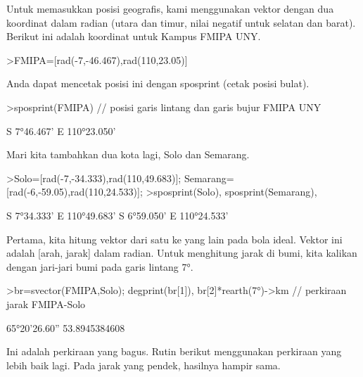\documentclass[a4paper,10pt]{article}
\begin{document}
\begin{eulernotebook}
\begin{eulercomment}
\begin{eulercomment}
\begin{eulercomment}
\begin{eulercomment}
\begin{eulercomment}
\begin{eulercomment}
\begin{eulercomment}
\begin{eulercomment}
\begin{eulercomment}
\begin{eulercomment}
\begin{eulercomment}
\begin{eulercomment}
\begin{eulercomment}
\begin{eulercomment}
\begin{eulercomment}
\begin{eulercomment}
\begin{eulercomment}
\begin{eulercomment}
\begin{eulercomment}
Untuk memasukkan posisi geografis, kami menggunakan vektor dengan dua
koordinat dalam radian (utara dan timur, nilai negatif untuk selatan
dan barat). Berikut ini adalah koordinat untuk Kampus FMIPA UNY.
\end{eulercomment}
\begin{eulerprompt}
>FMIPA=[rad(-7,-46.467),rad(110,23.05)]
\end{eulerprompt}
\begin{euleroutput}
  [-0.13569,  1.92657]
\end{euleroutput}
\begin{eulercomment}
Anda dapat mencetak posisi ini dengan sposprint (cetak posisi bulat).
\end{eulercomment}
\begin{eulerprompt}
>sposprint(FMIPA) // posisi garis lintang dan garis bujur FMIPA UNY
\end{eulerprompt}
\begin{euleroutput}
  S 7°46.467' E 110°23.050'
\end{euleroutput}
\begin{eulercomment}
Mari kita tambahkan dua kota lagi, Solo dan Semarang.
\end{eulercomment}
\begin{eulerprompt}
>Solo=[rad(-7,-34.333),rad(110,49.683)]; Semarang=[rad(-6,-59.05),rad(110,24.533)];
>sposprint(Solo), sposprint(Semarang),
\end{eulerprompt}
\begin{euleroutput}
  S 7°34.333' E 110°49.683'
  S 6°59.050' E 110°24.533'
\end{euleroutput}
\begin{eulercomment}
Pertama, kita hitung vektor dari satu ke yang lain pada bola ideal.
Vektor ini adalah [arah, jarak] dalam radian. Untuk menghitung jarak
di bumi, kita kalikan dengan jari-jari bumi pada garis lintang 7°.
\end{eulercomment}
\begin{eulerprompt}
>br=svector(FMIPA,Solo); degprint(br[1]), br[2]*rearth(7°)->km // perkiraan jarak FMIPA-Solo
\end{eulerprompt}
\begin{euleroutput}
  65°20'26.60''
  53.8945384608
\end{euleroutput}
\begin{eulercomment}
Ini adalah perkiraan yang bagus. Rutin berikut menggunakan perkiraan
yang lebih baik lagi. Pada jarak yang pendek, hasilnya hampir sama.
\end{eulercomment}

\end{eulercomment}
\end{eulercomment}
\end{eulercomment}
\end{eulercomment}
\end{eulercomment}
\end{eulercomment}
\end{eulercomment}
\end{eulercomment}
\end{eulercomment}
\end{eulercomment}
\end{eulercomment}
\end{eulercomment}
\end{eulercomment}
\end{eulercomment}
\end{eulercomment}
\end{eulercomment}
\end{eulercomment}
\end{eulercomment}
\end{eulernotebook}
\end{document}
